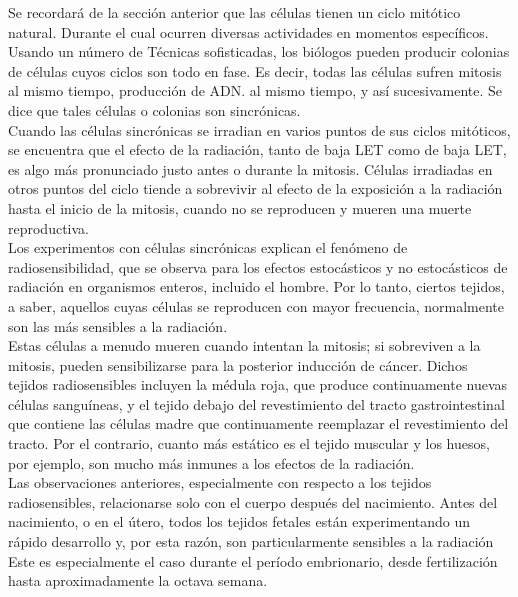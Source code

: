 \documentclass[]{article}
\begin{document}
Se recordará de la sección anterior que las células tienen un ciclo mitótico natural. Durante el cual ocurren diversas actividades en momentos específicos. Usando un número de Técnicas sofisticadas, los biólogos pueden producir colonias de células cuyos ciclos son todo en fase. Es decir, todas las células sufren mitosis al mismo tiempo, producción de ADN. al mismo tiempo, y así sucesivamente. Se dice que tales células o colonias son sincrónicas.\\

Cuando las células sincrónicas se irradian en varios puntos de sus ciclos mitóticos, se encuentra que el efecto de la radiación, tanto de baja LET como de baja LET, es algo más pronunciado justo antes o durante la mitosis. Células irradiadas en otros puntos del ciclo tiende a sobrevivir al efecto de la exposición a la radiación hasta el inicio de la mitosis, cuando no se reproducen y mueren una muerte reproductiva.\\

Los experimentos con células sincrónicas explican el fenómeno de radiosensibilidad, que se observa para los efectos estocásticos y no estocásticos de radiación en organismos enteros, incluido el hombre. Por lo tanto, ciertos tejidos, a saber, aquellos cuyas células se reproducen con mayor frecuencia, normalmente son las más sensibles a la radiación.\\

Estas células a menudo mueren cuando intentan la mitosis; si sobreviven a la mitosis, pueden sensibilizarse para la posterior inducción de cáncer. Dichos tejidos radiosensibles incluyen la médula roja, que produce continuamente nuevas células sanguíneas, y el tejido debajo del revestimiento del tracto gastrointestinal que contiene las células madre que continuamente reemplazar el revestimiento del tracto. Por el contrario, cuanto más estático es el tejido muscular y los huesos, por ejemplo, son mucho más inmunes a los efectos de la radiación.\\

Las observaciones anteriores, especialmente con respecto a los tejidos radiosensibles, relacionarse solo con el cuerpo después del nacimiento. Antes del nacimiento, o en el útero, todos los tejidos fetales están experimentando un rápido desarrollo y, por esta razón, son particularmente sensibles a la radiación Este es especialmente el caso durante el período embrionario, desde fertilización hasta aproximadamente la octava semana.\\
\end{document}
